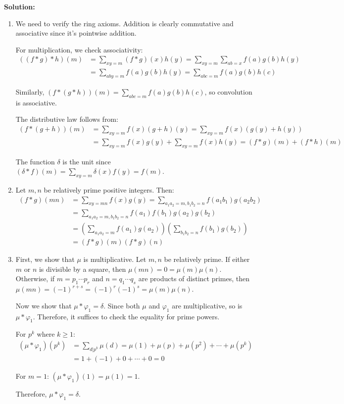 \noindent\textbf{Solution:}
\begin{enumerate}[label=(\alph*)]
    \item We need to verify the ring axioms. Addition is clearly commutative and associative since it's pointwise addition.
    
    For multiplication, we check associativity:
    \begin{align*}
    ((f * g) * h)(m) &= \sum_{xy=m} (f * g)(x)h(y) = \sum_{xy=m} \sum_{ab=x} f(a)g(b)h(y) \\
    &= \sum_{aby=m} f(a)g(b)h(y) = \sum_{abc=m} f(a)g(b)h(c)
    \end{align*}
    
    Similarly, $(f * (g * h))(m) = \sum_{abc=m} f(a)g(b)h(c)$, so convolution is associative.
    
    The distributive law follows from:
    \begin{align*}
    (f * (g + h))(m) &= \sum_{xy=m} f(x)(g + h)(y) = \sum_{xy=m} f(x)(g(y) + h(y)) \\
    &= \sum_{xy=m} f(x)g(y) + \sum_{xy=m} f(x)h(y) = (f * g)(m) + (f * h)(m)
    \end{align*}
    
    The function $\delta$ is the unit since $(\delta * f)(m) = \sum_{xy=m} \delta(x)f(y) = f(m)$.
    
    \item Let $m, n$ be relatively prime positive integers. Then:
    \begin{align*}
    (f * g)(mn) &= \sum_{xy=mn} f(x)g(y) = \sum_{a_1a_2=m, b_1b_2=n} f(a_1b_1)g(a_2b_2) \\
    &= \sum_{a_1a_2=m, b_1b_2=n} f(a_1)f(b_1)g(a_2)g(b_2) \\
    &= \left(\sum_{a_1a_2=m} f(a_1)g(a_2)\right)\left(\sum_{b_1b_2=n} f(b_1)g(b_2)\right) \\
    &= (f * g)(m)(f * g)(n)
    \end{align*}
    
    \item First, we show that $\mu$ is multiplicative. Let $m, n$ be relatively prime. If either $m$ or $n$ is divisible by a square, then $\mu(mn) = 0 = \mu(m)\mu(n)$. Otherwise, if $m = p_1 \cdots p_r$ and $n = q_1 \cdots q_s$ are products of distinct primes, then $\mu(mn) = (-1)^{r+s} = (-1)^r(-1)^s = \mu(m)\mu(n)$.
    
    Now we show that $\mu * \varphi_1 = \delta$. Since both $\mu$ and $\varphi_1$ are multiplicative, so is $\mu * \varphi_1$. Therefore, it suffices to check the equality for prime powers.
    
    For $p^k$ where $k \geq 1$:
    \begin{align*}
    (\mu * \varphi_1)(p^k) &= \sum_{d|p^k} \mu(d) = \mu(1) + \mu(p) + \mu(p^2) + \cdots + \mu(p^k) \\
    &= 1 + (-1) + 0 + \cdots + 0 = 0
    \end{align*}
    
    For $m = 1$: $(\mu * \varphi_1)(1) = \mu(1) = 1$.
    
    Therefore, $\mu * \varphi_1 = \delta$.
\end{enumerate}


